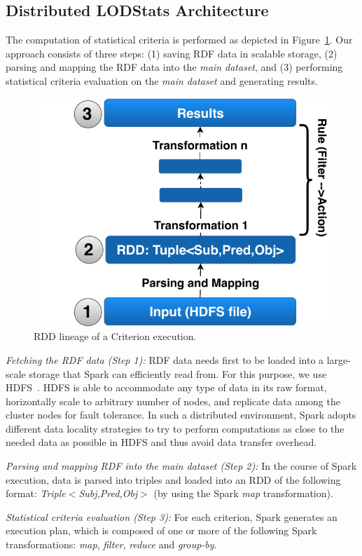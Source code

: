 \subsection{Distributed LODStats Architecture}

The computation of statistical criteria is performed as depicted in Figure~\ref{fig:RDD_Lineage}.
Our approach consists of three steps: (1) saving \gls{RDF} data in scalable storage, (2) parsing and mapping the \gls{RDF} data into the \emph{main dataset}, and (3) performing statistical criteria evaluation on the \emph{main dataset} and generating results.

\begin{figure}
\centering
\includegraphics[width=.45\columnwidth]{images/4_distlodstats/distlodstats-rdd-lineage.pdf}
\caption{RDD lineage of a Criterion execution.}
\label{fig:RDD_Lineage}
\end{figure}

\textit{Fetching the \gls{RDF} data (Step 1):} \gls{RDF} data needs first to be loaded into a large-scale storage that Spark can efficiently read from.
For this purpose, we use \gls{HDFS}~.
\gls{HDFS} is able to accommodate any type of data in its raw format, horizontally scale to arbitrary number of nodes, and replicate data among the cluster nodes for fault tolerance.
In such a distributed environment, Spark adopts different data locality strategies to try to perform computations as close to the needed data as possible in \gls{HDFS} and thus avoid data transfer overhead.
 
\textit{Parsing and mapping RDF into the main dataset (Step 2):} In the course of Spark execution, data is parsed into triples and loaded into an \gls{RDD} of the following format: \emph{Triple$<$Subj,Pred,Obj$>$} (by using the Spark \textit{map} transformation).

\textit{Statistical criteria evaluation (Step 3):} For each criterion, Spark generates an execution plan, which is composed of one or more of the following Spark transformations: \textit{map}, \textit{filter}, \textit{reduce} and \textit{group-by}. 

